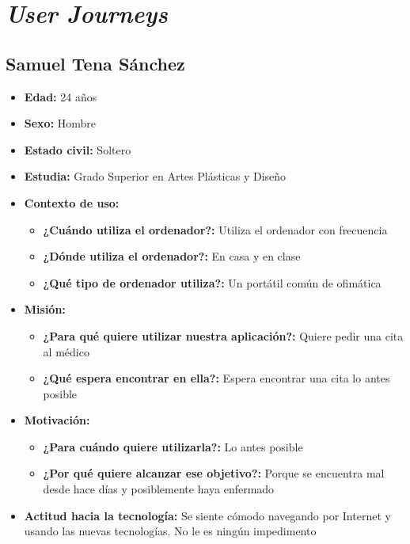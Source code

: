 \section{\textit{User Journeys}}\label{anexo}

\subsection{Samuel Tena Sánchez}
\begin{itemize}
    \item \textbf{Edad: } 24 años
    \item \textbf{Sexo: } Hombre
    \item \textbf{Estado civil: } Soltero
    \item \textbf{Estudia: } Grado Superior en Artes Plásticas y Diseño
    \item \textbf{Contexto de uso: } 
    \begin{itemize}
        \item \textbf{¿Cuándo utiliza el ordenador?: }  Utiliza el ordenador con frecuencia
        \item \textbf{¿Dónde utiliza el ordenador?: } En casa y en clase 
        \item \textbf{¿Qué tipo de ordenador utiliza?: } Un portátil común de ofimática
    \end{itemize}
    \item \textbf{Misión: } 
    \begin{itemize}
        \item \textbf{¿Para qué quiere utilizar nuestra aplicación?: } Quiere pedir una cita al médico
        \item \textbf{¿Qué espera encontrar en ella?: } Espera encontrar una cita lo antes posible 
    \end{itemize}
    \item \textbf{Motivación: } 
    \begin{itemize}
        \item \textbf{¿Para cuándo quiere utilizarla?: } Lo antes posible
        \item \textbf{¿Por qué quiere alcanzar ese objetivo?: } Porque se encuentra mal desde hace días y posiblemente haya enfermado
    \end{itemize}
    \item \textbf{Actitud hacia la tecnología: } Se siente cómodo navegando por Internet y usando las nuevas tecnologías. No le es ningún impedimento
\end{itemize}

